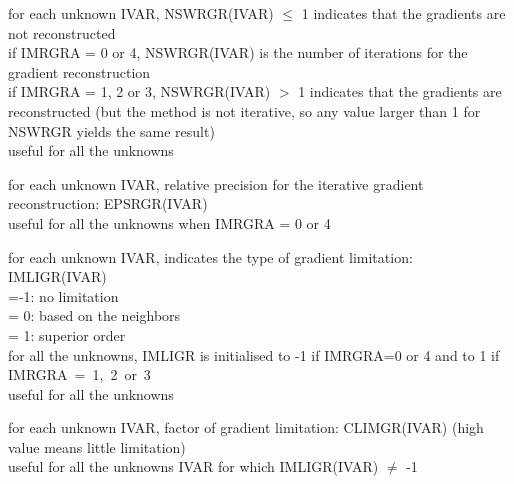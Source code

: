 {for each unknown IVAR, NSWRGR(IVAR) $\leqslant$ 1 indicates that the
gradients are not reconstructed\\ 
\hspace*{1.3cm}if IMRGRA = 0 or 4, NSWRGR(IVAR) is the number of
iterations for the gradient reconstruction\\
\hspace*{1.3cm}if IMRGRA = 1, 2 or 3, NSWRGR(IVAR) $>$ 1 indicates that
the gradients are reconstructed (but the method is not iterative, so any value
larger than 1 for NSWRGR yields the same result)\\ 
useful for all the unknowns}

{for each unknown IVAR, relative precision for the iterative gradient
reconstruction: EPSRGR(IVAR)\\
useful for all the unknowns when IMRGRA = 0 or 4}

{for each unknown IVAR, indicates the type of gradient limitation:
IMLIGR(IVAR)\\
\hspace*{1.3cm}=-1: no limitation\\
\hspace*{1.3cm}= 0: based on the neighbors\\
\hspace*{1.3cm}= 1: superior order\\
for all the unknowns, IMLIGR is initialised to -1 if IMRGRA=0 or 4 and to 1 if 
\mbox{IMRGRA = 1, 2 or 3}\\ 
useful for all the unknowns}

{for each unknown IVAR, factor of gradient limitation: CLIMGR(IVAR) (high
value means little limitation)\\
useful for all the unknowns IVAR for which IMLIGR(IVAR) $\ne$ -1}

